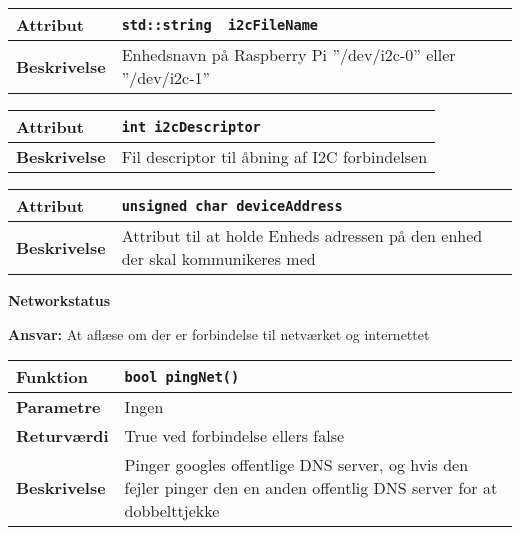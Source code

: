 \begin{center}
    \begin{tabular}{ | l | p{} |}
    \hline
    \textbf{Attribut}		& \verb+std::string  i2cFileName +								\\ \hline
    \textbf{Beskrivelse} 	& Enhedsnavn på Raspberry Pi ''/dev/i2c-0'' eller ''/dev/i2c-1''	\\ \hline
    \end{tabular}
\end{center}

\begin{center}
    \begin{tabular}{ | l | p{} |}
    \hline
    \textbf{Attribut}		& \verb+int i2cDescriptor +										\\ \hline
    \textbf{Beskrivelse} 	& Fil descriptor til åbning af I2C forbindelsen					\\ \hline
    \end{tabular}
\end{center}

\begin{center}
    \begin{tabular}{ | l | p{} |}
    \hline
    \textbf{Attribut}		& \verb+unsigned char deviceAddress + 								\\ \hline
    \textbf{Beskrivelse} 	& Attribut til at holde Enheds adressen på den enhed der skal kommunikeres med					\\ \hline
    \end{tabular}
\end{center}

{\centering
\textbf{Networkstatus}\par
}
\textbf{Ansvar:} At aflæse om der er forbindelse til netværket og internettet \

\begin{center}
    \begin{tabular}{ | l | p{} |}
    \hline
    \textbf{Funktion}	& \verb+bool pingNet() +\\ \hline
    \textbf{Parametre} 	& Ingen \\ \hline
    \textbf{Returværdi}	& True ved forbindelse ellers false \\ \hline
    \textbf{Beskrivelse}	& Pinger googles offentlige DNS server, og hvis den fejler pinger den en anden offentlig DNS server for at dobbelttjekke\\ \hline
    \end{tabular}
\end{center}

